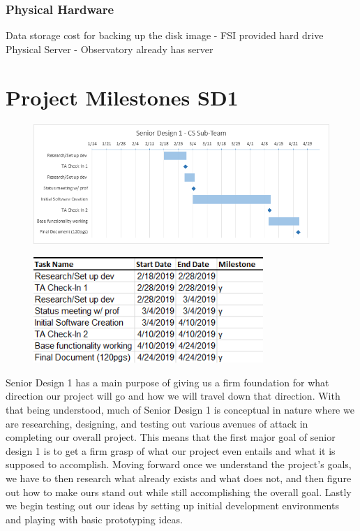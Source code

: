 \documentclass[12pt]{report}
\begin{document}
\subsubsection*{Physical Hardware}

Data storage cost for backing up the disk image - FSI provided hard drive\\
Physical Server - Observatory already has server

\newpage

\section*{Project Milestones SD1}

\begin{figure}[h]
	\centering
	\includegraphics[width=\linewidth]{SD1Gantt}
\end{figure}

\begin{figure}[h]
	\centering
	\includegraphics[width=0.6\linewidth, height=4.0cm]{SD1Dates}
\end{figure}

Senior Design 1 has a main purpose of giving us a firm foundation for what direction our project will go and how we will travel down that direction. With that being understood, much of Senior Design 1 is conceptual in nature where we are researching, designing, and testing out various avenues of attack in completing our overall project. This means that the first major goal of senior design 1 is to get a firm grasp of what our project even entails and what it is supposed to accomplish. Moving forward once we understand the project's goals, we have to then research what already exists and what does not, and then figure out how to make ours stand out while still accomplishing the overall goal. Lastly we begin testing out our ideas by setting up initial development environments and playing with basic prototyping ideas.
\end{document}
